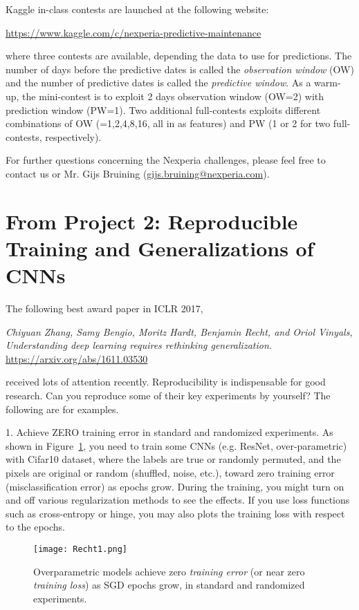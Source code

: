 \documentclass[11pt]{article}
\begin{document}
Kaggle in-class contests are launched at the following website:

\url{https://www.kaggle.com/c/nexperia-predictive-maintenance}

\noindent where three contests are available, depending the data to use for predictions. The number of days before the predictive dates is called the \emph{observation window} (OW) and the number of predictive dates is called the \emph{predictive window}. As a warm-up, the mini-contest is to exploit 2 days observation window (OW=2) with prediction window (PW=1). Two additional full-contests exploits different combinations of OW (=1,2,4,8,16, all in as features) and PW (1 or 2 for two full-contests, respectively). 

For further questions concerning the Nexperia challenges, please feel free to contact us or Mr. Gijs Bruining (\href{gijs.bruining@nexperia.com}{gijs.bruining@nexperia.com}). 

\section{From Project 2: Reproducible Training and Generalizations of CNNs} 

The following best award paper in ICLR 2017, 

\emph{Chiyuan Zhang, Samy Bengio, Moritz Hardt, Benjamin Recht, and Oriol Vinyals, Understanding deep learning requires rethinking generalization.} \url{https://arxiv.org/abs/1611.03530}

\noindent received lots of attention recently. Reproducibility is indispensable for good research. Can you reproduce some of their key experiments by yourself? The following are for examples. 

1. Achieve ZERO training error in standard and randomized experiments. As shown in Figure~\ref{fig:Recht1}, you need to train some CNNs (e.g. ResNet, over-parametric) with Cifar10 dataset, where the labels are true or randomly permuted, and the pixels are original or random (shuffled, noise, etc.), toward zero training error (misclassification error) as epochs grow. During the training, you might turn on and off various regularization methods to see the effects. If you use loss functions such as cross-entropy or hinge, you may also plots the training loss with respect to the epochs. 
\begin{figure}
\center
\texttt{[image: Recht1.png]}  
\caption{Overparametric models achieve zero \emph{training error} (or near zero \emph{training loss}) as SGD epochs grow, in standard and randomized experiments.}
\label{fig:Recht1}
\end{figure}
\end{document}
